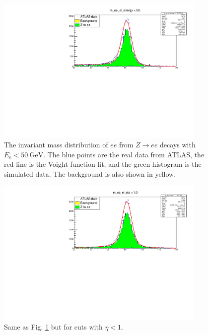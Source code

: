\documentclass[a4paper]{report}
\numberwithin{equation}{section}
\begin{document}
\begin{figure}[htpb]
    \centering
    \includegraphics[width=0.9\textwidth]{zeefit_elen50.pdf}
    \caption{The invariant mass distribution of $ee$ from $Z \rightarrow ee$ decays with $E_e < \SI{50}{\giga\electronvolt}$. The blue points are the 
    real data from ATLAS, the red line is the Voight function fit, and the green histogram is the simulated data. The background 
    is also shown in yellow.}
    \label{fig:zee_calib_en50}
\end{figure}

\begin{figure}[htpb]
    \centering
    \includegraphics[width=0.9\textwidth]{zeefit_eleta1.pdf}
    \caption{Same as Fig. \ref*{fig:zee_calib_en50} but for cuts with $\eta < 1$.}
    \label{fig:zee_calib_eta1}
\end{figure}
\end{document}
